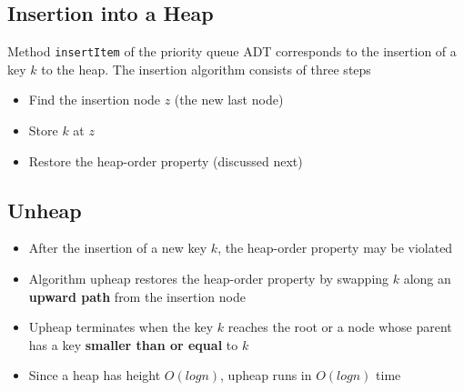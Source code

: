 \documentclass{article}
\begin{document}
\subsection{Insertion into a Heap}
\begin{flushleft}
Method \texttt{insertItem} of the priority queue ADT corresponds to the insertion of a key $k$ to the heap. The insertion algorithm consists of three steps
\begin{itemize}
	\item Find the insertion node $z$ (the new last node)
	\item Store $k$ at $z$
	\item Restore the heap-order property (discussed next)
\end{itemize}
\end{flushleft}

\subsection{Unheap}
\begin{itemize}
	\item After the insertion of a new key $k$, the heap-order property may be violated
	\item Algorithm upheap restores the heap-order property by swapping $k$ along an \textbf{upward path} from the insertion node
	\item Upheap terminates when the key $k$ reaches the root or a node whose parent has a key \textbf{smaller than or equal} to $k$
	\item Since a heap has height $O(log n)$, upheap runs in $O(log n)$ time
\end{itemize}
\end{document}
